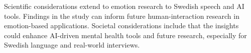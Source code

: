 Scientific considerations extend to emotion research to Swedish speech and AI tools. Findings in the study can inform future human-interaction research in emotion-based applications. Societal considerations include that the insights could enhance AI-driven mental health tools and future research, especially for Swedish language and real-world interviews. 

